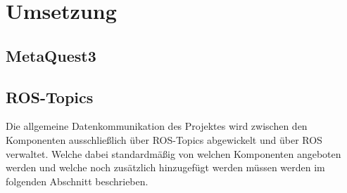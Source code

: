 \chapter{Umsetzung}
\section{MetaQuest3}
\section{ROS-Topics}\label{sec:ros-topics}
Die allgemeine Datenkommunikation des Projektes wird zwischen den Komponenten ausschließlich über \ac{ROS}-Topics abgewickelt und über \ac{ROS} verwaltet. Welche dabei standardmäßig von welchen Komponenten angeboten werden und welche noch zusätzlich hinzugefügt werden müssen werden im folgenden Abschnitt beschrieben.\\
